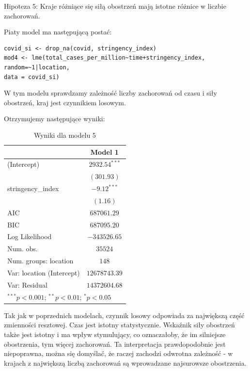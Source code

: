 \documentclass[12pt]{mwbk}
\theoremstyle{plain}
\theoremstyle{definition}
\theoremstyle{remark}
\begin{document}
Hipoteza 5: Kraje różniące się siłą obostrzeń mają istotne różnice w liczbie zachorowań.


Piaty model ma następującą postać:

\begin{verbatim}
covid_si <- drop_na(covid, stringency_index)
mod4 <- lme(total_cases_per_million~time+stringency_index,
random=~1|location,
data = covid_si)
\end{verbatim}

W tym modelu sprawdzamy zależność liczby zachorowań od czasu i siły obostrzeń, kraj jest czynnikiem losowym.

Otrzymujemy następujące wyniki:

\begin{table}
	\begin{center}
		\begin{tabular}{l c}
			\hline
			& Model 1 \\
			\hline
			(Intercept)               & $2932.54^{***}$ \\
			& $(301.93)$      \\
			stringency\_index         & $-9.12^{***}$   \\
			& $(1.16)$        \\
			\hline
			AIC                       & $687061.29$     \\
			BIC                       & $687095.20$     \\
			Log Likelihood            & $-343526.65$    \\
			Num. obs.                 & $35524$         \\
			Num. groups: location     & $148$           \\
			Var: location (Intercept) & $12678743.39$   \\
			Var: Residual             & $14372604.68$   \\
			\hline
			\multicolumn{2}{l}{\scriptsize{$^{***}p<0.001$; $^{**}p<0.01$; $^{*}p<0.05$}}
		\end{tabular}
		\caption{Wyniki dla modelu 5}
		\label{table:model5}
	\end{center}
\end{table}
Tak jak w poprzednich modelach, czynnik losowy odpowiada za największą część zmienności resztowej. Czas jest istotny statystycznie. Wskaźnik siły obostrzeń także jest istotny i ma wpływ stymulujący, co oznaczałoby, że im silniejsze obostrzenia, tym więcej zachorowań. Ta interpretacja prawdopodobnie jest niepoprawna, można się domyślać, że raczej zachodzi odwrotna zależność - w krajach z największą liczbą zachorowań są wprowadzane najsurowsze obostrzenia.
\end{document}
